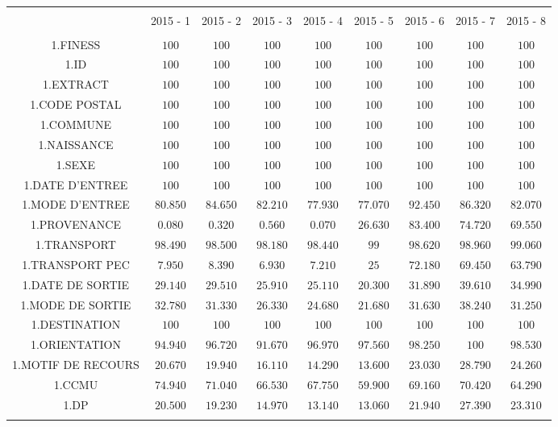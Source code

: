 \documentclass[]{article}
\begin{document}
\begin{table}[!htbp] \centering 
  \caption{} 
  \label{} 
\begin{tabular}{@{\extracolsep{5pt}} ccccccccc} 
\\[-1.8ex]\hline 
\hline \\[-1.8ex] 
 & 2015 - 1 & 2015 - 2 & 2015 - 3 & 2015 - 4 & 2015 - 5 & 2015 - 6 & 2015 - 7 & 2015 - 8 \\ 
\hline \\[-1.8ex] 
1.FINESS & $100$ & $100$ & $100$ & $100$ & $100$ & $100$ & $100$ & $100$ \\ 
1.ID & $100$ & $100$ & $100$ & $100$ & $100$ & $100$ & $100$ & $100$ \\ 
1.EXTRACT & $100$ & $100$ & $100$ & $100$ & $100$ & $100$ & $100$ & $100$ \\ 
1.CODE POSTAL & $100$ & $100$ & $100$ & $100$ & $100$ & $100$ & $100$ & $100$ \\ 
1.COMMUNE & $100$ & $100$ & $100$ & $100$ & $100$ & $100$ & $100$ & $100$ \\ 
1.NAISSANCE & $100$ & $100$ & $100$ & $100$ & $100$ & $100$ & $100$ & $100$ \\ 
1.SEXE & $100$ & $100$ & $100$ & $100$ & $100$ & $100$ & $100$ & $100$ \\ 
1.DATE D'ENTREE & $100$ & $100$ & $100$ & $100$ & $100$ & $100$ & $100$ & $100$ \\ 
1.MODE D'ENTREE & $80.850$ & $84.650$ & $82.210$ & $77.930$ & $77.070$ & $92.450$ & $86.320$ & $82.070$ \\ 
1.PROVENANCE & $0.080$ & $0.320$ & $0.560$ & $0.070$ & $26.630$ & $83.400$ & $74.720$ & $69.550$ \\ 
1.TRANSPORT & $98.490$ & $98.500$ & $98.180$ & $98.440$ & $99$ & $98.620$ & $98.960$ & $99.060$ \\ 
1.TRANSPORT PEC & $7.950$ & $8.390$ & $6.930$ & $7.210$ & $25$ & $72.180$ & $69.450$ & $63.790$ \\ 
1.DATE DE SORTIE & $29.140$ & $29.510$ & $25.910$ & $25.110$ & $20.300$ & $31.890$ & $39.610$ & $34.990$ \\ 
1.MODE DE SORTIE & $32.780$ & $31.330$ & $26.330$ & $24.680$ & $21.680$ & $31.630$ & $38.240$ & $31.250$ \\ 
1.DESTINATION & $100$ & $100$ & $100$ & $100$ & $100$ & $100$ & $100$ & $100$ \\ 
1.ORIENTATION & $94.940$ & $96.720$ & $91.670$ & $96.970$ & $97.560$ & $98.250$ & $100$ & $98.530$ \\ 
1.MOTIF DE RECOURS & $20.670$ & $19.940$ & $16.110$ & $14.290$ & $13.600$ & $23.030$ & $28.790$ & $24.260$ \\ 
1.CCMU & $74.940$ & $71.040$ & $66.530$ & $67.750$ & $59.900$ & $69.160$ & $70.420$ & $64.290$ \\ 
1.DP & $20.500$ & $19.230$ & $14.970$ & $13.140$ & $13.060$ & $21.940$ & $27.390$ & $23.310$ \\ 
\hline \\[-1.8ex] 
\end{tabular} 
\end{table}
\end{document}
